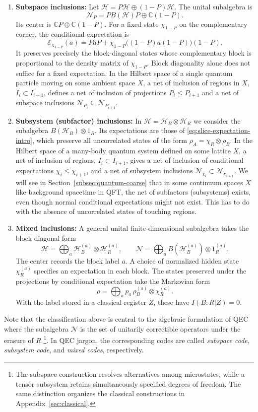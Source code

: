 \documentclass[a4paper,11pt]{article}
\theoremstyle{definition}
\newcommand{\mN}{\mathcal{N}}
\newcommand{\mE}{\mathcal{E}}
\begin{document}
\begin{enumerate}
 \item {\bf Subspace inclusions:} Let $\mathcal H=P\mathcal H\oplus(1-P)\mathcal H$.
 The unital subalgebra is
 \[
  \mN_P=P B(\mathcal H)P\oplus\mathbb C(1-P).
 \]
 Its center is $\mathbb CP\oplus\mathbb C(1-P)$. For a fixed state $\chi_{1-P}$
 on the complementary corner, the conditional expectation is
 \[
  \mE_{\chi_{1-P}}(a)=PaP+
  \chi_{1-P}\bigl((1-P)a(1-P)\bigr)(1-P).
 \]
 It preserves precisely the block-diagonal states whose complementary block
 is proportional to the density matrix of $\chi_{1-P}$.
 Block diagonality alone does not suffice for a fixed expectation.
In the Hilbert space of a single quantum particle moving on some ambient space $X$, a net of inclusion of regions in $X$, $I_i\subset I_{i+1}$, defines a net of inclusion of projections $P_i\leq P_{i+1}$ and a net of subspace inclusions $\mN_{P_i}\subseteq\mN_{P_{i+1}}$. 
 
 \item {\bf Subsystem (subfactor) inclusions:} In $\mathcal H=\mathcal H_B\otimes\mathcal H_R$ we consider the subalgebra $B(\mathcal H_B)\otimes1_R$.
 Its expectations are those of \eqref{eq:slice-expectation-intro}, which preserve all uncorrelated states of the form $\rho_A=\chi_R\otimes \rho_B$. In the Hilbert space of a many-body quantum system defined on some lattice $X$, a net of inclusion of regions, $I_i\subset I_{i+1}$, gives a net of inclusion of conditional expectations $\chi_i \leq\chi_{i+1}$, and a net of subsystem inclusions $\mN_{\chi_i}\subset \mN_{\chi_{i+1}}$. We will see in Section~\ref{subsec:quantum-coarse} that in some continuum spaces $X$ like background spacetime in QFT, the net of subfactors (subsystems) exists, even though normal conditional expectations might not exist. This has to do with the absence of uncorrelated states of touching regions.
 
 \item {\bf Mixed inclusions:} A general unital finite-dimensional subalgebra takes the block diagonal form
 \[
  \mathcal H=\bigoplus_a\mathcal H_B^{(a)}\otimes\mathcal H_R^{(a)},\qquad
  \mN=\bigoplus_a B(\mathcal H_B^{(a)})\otimes1_R^{(a)}.
 \]
 The center records the block label $a$. A choice of normalized hidden state $\chi_R^{(a)}$ specifies an
 expectation in each block. The states preserved under the projections by conditional expectation take the Markovian form
 \[
  \rho=\bigoplus_a p_a\,\rho_B^{(a)}\otimes\chi_R^{(a)}.
 \]
 With the label stored in a classical register $Z$, these have $I(B:R|Z)=0$.
\end{enumerate}
Note that the classification above is central to the algebraic formulation of QEC where the subalgebra $\mN$ is the set of unitarily correctible operators under the erasure of $R$ \cite{BenyKempfKribs2007} \footnote{The subspace construction resolves alternatives among microstates, while a tensor
subsystem retains simultaneously specified degrees of freedom. The same distinction
organizes the classical constructions in Appendix~\ref{sec:classical}.
}. In QEC jargon, the corresponding codes are called {\it subspace code}, {\it subsystem code}, and {\it mixed codes}, respectively.
\end{document}
